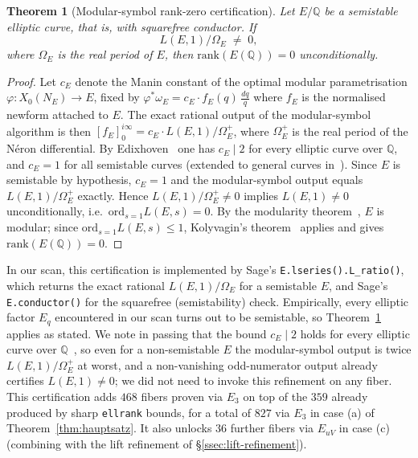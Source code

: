 \documentclass[12pt,a4paper,reqno]{amsart}
\theoremstyle{plain}
\newtheorem{theorem}{Theorem}[section]
\theoremstyle{definition}
\theoremstyle{remark}
\newcommand{\Q}{\mathbb{Q}}
\begin{document}
\begin{theorem}[Modular-symbol rank-zero certification]
\label{thm:kolyvagin-cert}
Let $E/\Q$ be a semistable elliptic curve, that is, with squarefree conductor. If
$$
L(E, 1) / \Omega_E \;\neq\; 0,
$$
where $\Omega_E$ is the real period of $E$, then $\mathrm{rank}(E(\Q)) = 0$ unconditionally.
\end{theorem}

\begin{proof}
Let $c_E$ denote the Manin constant of the optimal modular parametrisation
$\varphi: X_0(N_E) \to E$, fixed by $\varphi^* \omega_E = c_E \cdot f_E(q)\,\frac{dq}{q}$
where $f_E$ is the normalised newform attached to $E$. The exact rational
output of the modular-symbol algorithm is then
$[f_E]_0^{i\infty} = c_E \cdot L(E, 1)/\Omega_E^+$, where $\Omega_E^+$ is the
real period of the N\'eron differential. By Edixhoven~\cite{edixhoven-manin}
one has $c_E \mid 2$ for every elliptic curve over $\Q$, and $c_E = 1$ for
all semistable curves (extended to general curves
in~\cite{cesnavicius-manin}). Since $E$ is semistable by hypothesis, $c_E = 1$
and the modular-symbol output equals $L(E, 1)/\Omega_E^+$ exactly. Hence
$L(E, 1)/\Omega_E^+ \neq 0$ implies $L(E, 1) \neq 0$
unconditionally, i.e.\ $\mathrm{ord}_{s=1} L(E, s) = 0$. By the modularity
theorem~\cite{breuil-conrad-diamond-taylor}, $E$ is modular; since
$\mathrm{ord}_{s=1} L(E, s) \le 1$, Kolyvagin's
theorem~\cite{kolyvagin} applies and gives $\mathrm{rank}(E(\Q)) = 0$.
\end{proof}

In our scan, this certification is implemented by Sage's
\texttt{E.lseries().L\_ratio()}, which returns the exact rational
$L(E, 1) / \Omega_E$ for a semistable $E$, and Sage's
\texttt{E.conductor()} for the squarefree (semistability) check.
Empirically, every elliptic factor $E_q$ encountered in our scan turns
out to be semistable, so Theorem~\ref{thm:kolyvagin-cert} applies as
stated. We note in passing that the bound $c_E \mid 2$ holds for every
elliptic curve over $\Q$~\cite{edixhoven-manin}, so even for a
non-semistable $E$ the modular-symbol output is twice $L(E, 1)/\Omega_E^+$
at worst, and a non-vanishing odd-numerator output already certifies
$L(E, 1) \neq 0$; we did not need to invoke this refinement on any
fiber. This certification adds $468$ fibers proven via $E_3$ on top of
the $359$ already produced by sharp \texttt{ellrank} bounds, for a total
of $827$ via $E_3$ in case (a) of Theorem~\ref{thm:hauptsatz}. It also
unlocks $36$ further fibers via $E_{uV}$ in case (c) (combining with the
lift refinement of \S\ref{ssec:lift-refinement}).
\end{document}
